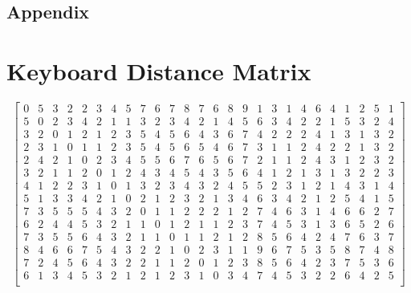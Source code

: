 \documentclass[12pt]{article}
\numberwithin{equation}{section}
\begin{document}
\newpage



\newpage
\section{Appendix}
\appendix
\chapter{Keyboard Distance Matrix}
\setcounter{MaxMatrixCols}{26}
\[ 
\begin{bmatrix}
0 & 5 & 3 & 2 & 2 & 3 & 4 & 5 & 7 & 6 & 7 & 8 & 7 & 6 & 8 & 9 & 1 & 3 & 1 & 4 & 6 & 4 & 1 & 2 & 5 & 1 \\
5 & 0 & 2 & 3 & 4 & 2 & 1 & 1 & 3 & 2 & 3 & 4 & 2 & 1 & 4 & 5 & 6 & 3 & 4 & 2 & 2 & 1 & 5 & 3 & 2 & 4 \\
3 & 2 & 0 & 1 & 2 & 1 & 2 & 3 & 5 & 4 & 5 & 6 & 4 & 3 & 6 & 7 & 4 & 2 & 2 & 2 & 4 & 1 & 3 & 1 & 3 & 2 \\
2 & 3 & 1 & 0 & 1 & 1 & 2 & 3 & 5 & 4 & 5 & 6 & 5 & 4 & 6 & 7 & 3 & 1 & 1 & 2 & 4 & 2 & 2 & 1 & 3 & 2 \\
2 & 4 & 2 & 1 & 0 & 2 & 3 & 4 & 5 & 5 & 6 & 7 & 6 & 5 & 6 & 7 & 2 & 1 & 1 & 2 & 4 & 3 & 1 & 2 & 3 & 2 \\
3 & 2 & 1 & 1 & 2 & 0 & 1 & 2 & 4 & 3 & 4 & 5 & 4 & 3 & 5 & 6 & 4 & 1 & 2 & 1 & 3 & 1 & 3 & 2 & 2 & 3 \\
4 & 1 & 2 & 2 & 3 & 1 & 0 & 1 & 3 & 2 & 3 & 4 & 3 & 2 & 4 & 5 & 5 & 2 & 3 & 1 & 2 & 1 & 4 & 3 & 1 & 4 \\
5 & 1 & 3 & 3 & 4 & 2 & 1 & 0 & 2 & 1 & 2 & 3 & 2 & 1 & 3 & 4 & 6 & 3 & 4 & 2 & 1 & 2 & 5 & 4 & 1 & 5 \\
7 & 3 & 5 & 5 & 5 & 4 & 3 & 2 & 0 & 1 & 1 & 2 & 2 & 2 & 1 & 2 & 7 & 4 & 6 & 3 & 1 & 4 & 6 & 6 & 2 & 7 \\
6 & 2 & 4 & 4 & 5 & 3 & 2 & 1 & 1 & 0 & 1 & 2 & 1 & 1 & 2 & 3 & 7 & 4 & 5 & 3 & 1 & 3 & 6 & 5 & 2 & 6 \\
7 & 3 & 5 & 5 & 6 & 4 & 3 & 2 & 1 & 1 & 0 & 1 & 1 & 2 & 1 & 2 & 8 & 5 & 6 & 4 & 2 & 4 & 7 & 6 & 3 & 7 \\
8 & 4 & 6 & 6 & 7 & 5 & 4 & 3 & 2 & 2 & 1 & 0 & 2 & 3 & 1 & 1 & 9 & 6 & 7 & 5 & 3 & 5 & 8 & 7 & 4 & 8 \\
7 & 2 & 4 & 5 & 6 & 4 & 3 & 2 & 2 & 1 & 1 & 2 & 0 & 1 & 2 & 3 & 8 & 5 & 6 & 4 & 2 & 3 & 7 & 5 & 3 & 6 \\
6 & 1 & 3 & 4 & 5 & 3 & 2 & 1 & 2 & 1 & 2 & 3 & 1 & 0 & 3 & 4 & 7 & 4 & 5 & 3 & 2 & 2 & 6 & 4 & 2 & 5 \\

\end{bmatrix}\]
\end{document}
